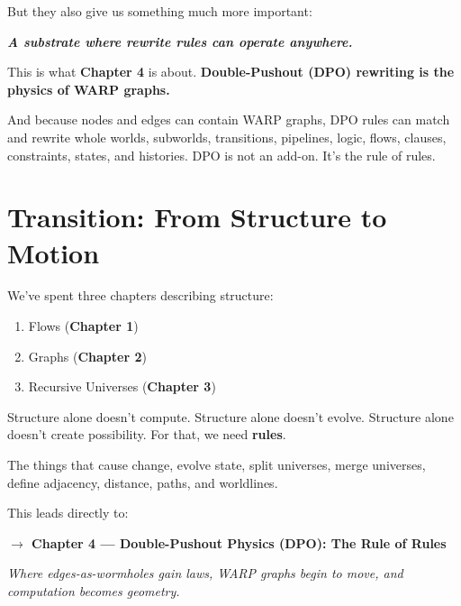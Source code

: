 But they also give us something much more important:

\textbf{\textit{A substrate where rewrite rules can operate anywhere.}}

This is what \textbf{Chapter 4} is about. \textbf{Double-Pushout (DPO) rewriting is the physics of WARP graphs.}

And because nodes and edges can contain WARP graphs, DPO rules can match and rewrite whole worlds, subworlds, transitions, pipelines, logic, flows, clauses, constraints, states, and histories. DPO is not an add-on. It's the rule of rules.

\section*{Transition: From Structure to Motion}

We've spent three chapters describing structure:
\begin{enumerate}
    \item Flows (\textbf{Chapter 1})
    \item Graphs (\textbf{Chapter 2})
    \item Recursive Universes (\textbf{Chapter 3})
\end{enumerate}

Structure alone doesn't compute. Structure alone doesn't evolve. Structure alone doesn't create possibility. For that, we need \textbf{rules}.

The things that cause change, evolve state, split universes, merge universes, define adjacency, distance, paths, and worldlines.

This leads directly to:

\textbf{$\rightarrow$ Chapter 4 — Double-Pushout Physics (DPO): The Rule of Rules}

\textit{Where edges-as-wormholes gain laws, WARP graphs begin to move, and computation becomes geometry.}
